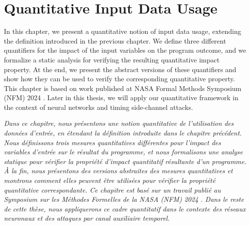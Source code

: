 
\setchapterpreamble[u]{\margintoc}
%

\chapter{Quantitative Input Data Usage}


In this chapter, we present a quantitative notion of input data usage, extending the definition introduced in the previous chapter.
We define three different quantifiers for the impact of the input variables on the program outcome, and we formalize a static analysis for verifying the resulting quantitative impact property.
At the end, we present the abstract versions of these quantifiers and show how they can be used to verify the corresponding quantitative property.
This chapter is based on work published at NASA Formal Methods Symposium (NFM) 2024 \cite{Mazzucato2024b}.
Later in this thesis, we will apply our quantitative framework in the context of neural networks and timing side-channel attacks.

\frenchdiv

\emph{Dans ce chapitre, nous présentons une notion quantitative de l'utilisation des données d'entrée, en étendant la définition introduite dans le chapitre précédent. Nous définissons trois mesures quantitatives différentes pour l'impact des variables d'entrée sur le résultat du programme, et nous formalisons une analyse statique pour vérifier la propriété d'impact quantitatif résultante d'un programme. À la fin, nous présentons des versions abstraites des mesures quantitatives et montrons comment elles peuvent être utilisées pour vérifier la propriété quantitative correspondante. Ce chapitre est basé sur un travail publié au Symposium sur les Méthodes Formelles de la NASA (NFM) 2024 . Dans le reste de cette thèse, nous appliquerons ce cadre quantitatif dans le contexte des réseaux neuronaux et des attaques par canal auxiliaire temporel.}



